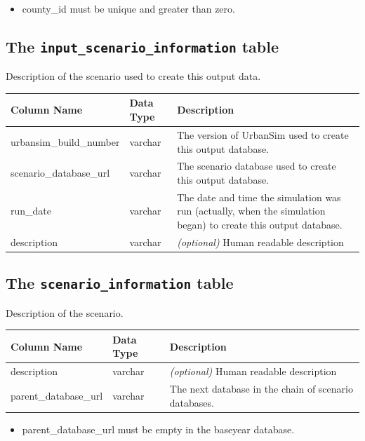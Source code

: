 \begin{itemize} \tight
\item county_id must be unique and greater than zero.

\end{itemize}

\subsection{The {\tt input_scenario_information} table}


Description of the scenario used to create this output data.


\begin{tabular}{|l|l|p{3.6in}|}
\hline
\textbf{Column Name} & \textbf{Data Type} & \textbf{Description} \\
\hline
urbansim_build_number & varchar & The version of UrbanSim used to create this output database.  \\
\hline
scenario_database_url & varchar & The scenario database used to create this output database.  \\
\hline
run_date & varchar &  The date and time the simulation was run (actually, when the simulation began) to create this output database.  \\
\hline
description & varchar & \emph{(optional) }
Human readable description  \\
\hline

\end{tabular}


\subsection{The {\tt scenario_information} table}
\label{urbansim-database-tables-scenario-inforamtion}

Description of the scenario.


\begin{tabular}{|l|l|p{3.9in}|}
\hline
\textbf{Column Name} & \textbf{Data Type} & \textbf{Description} \\
\hline description & varchar & \emph{(optional) }
Human readable description  \\
\hline
parent_database_url & varchar & The next database in the chain of scenario databases.  \\
\hline

\end{tabular}

\begin{itemize} \tight
\item parent_database_url must be empty in the baseyear database.

\end{itemize}

